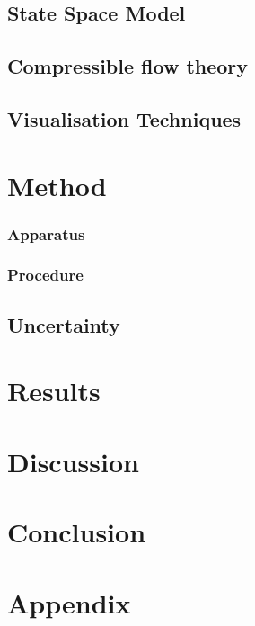 \documentclass{article}
\begin{document}
\subsection{State Space Model}


\subsection{Compressible flow theory}

\subsection{Visualisation Techniques}


\section{Method}

\subsubsection{Apparatus}


\subsubsection{Procedure}


\subsection{Uncertainty}



\section{Results}


\section{Discussion}



\section{Conclusion}


\newpage
\section{Appendix}


\newpage
\begin{thebibliography}{9}

\end{thebibliography}
\end{document}
